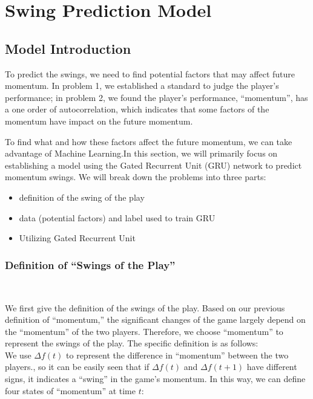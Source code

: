 \section{Swing Prediction Model}

\subsection{Model Introduction}

To predict the swings, we need to find potential factors that may affect future momentum.
In problem 1, we established a standard to judge the player's performance;
in problem 2, we found the player's performance, ``momentum'', has a one order of autocorrelation,
which indicates that some factors of the momentum have impact on the future momentum.

To find what and how these factors affect the future momentum, we can take advantage 
of Machine Learning.In this section, we will primarily focus on establishing a model using the Gated Recurrent Unit (GRU) network to 
predict momentum swings. We will break down the problems into three parts:

\begin{itemize}
    \item definition of the swing of the play
    \item data (potential factors) and label used to train GRU
    \item Utilizing Gated Recurrent Unit
\end{itemize}

\subsubsection{Definition of ``Swings of the Play''}~{}

We first give the definition of the swings of the play.
Based on our previous definition of ``momentum,'' the significant changes of the game 
largely depend on the ``momentum'' of the two players. Therefore, we choose ``momentum'' to represent 
the swings of the play. The specific definition is as follows:\\

We use $\Delta f(t)$ to represent the difference in ``momentum'' between the two players., 
so it can be easily seen that if $\Delta f(t)$ and $\Delta f(t+1)$
have different signs, it indicates a ``swing'' in the game's momentum. 
In this way, we can define four states of ``momentum'' at time $t$:

